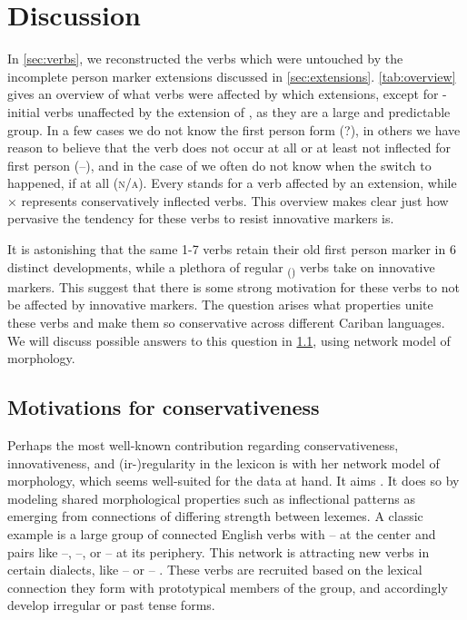\section{Discussion}
\label{sec:discussion}
In \cref{sec:verbs}, we reconstructed the verbs which were untouched by the incomplete person marker extensions discussed in \cref{sec:extensions}.
\cref{tab:overview} gives an overview of what verbs were affected by which extensions, except for -initial \akuriyo verbs unaffected by the extension of , as they are a large and predictable group.
In a few cases we do not know the first person form (?), in others we have reason to believe that the verb does not occur at all or at least not inflected for first person (–), and in the case of  we often do not know when the switch to  happened, if at all (\textsc{n/a}).
Every \checkmark stands for a verb affected by an extension, while × represents conservatively inflected verbs.
This overview makes clear just how pervasive the tendency for these verbs to resist innovative markers is.



It is astonishing that the same 1-7 verbs retain their old first person marker in 6 distinct developments, while a plethora of regular \textsubscript{()} verbs take on innovative markers.
This suggest that there is some strong motivation for these verbs to not be affected by innovative markers.
The question arises what properties unite these verbs and make them so conservative across different Cariban languages.
We will discuss possible answers to this question in \cref{sec:motivations}, using  network model of morphology.

\subsection{Motivations for conservativeness}
\label{sec:motivations}
Perhaps the most well-known contribution regarding conservativeness, innovativeness, and (ir-){}re\-gu\-la\-ri\-ty in the lexicon is \textcite{bybee1985morphology} with her network model of morphology, which seems well-suited for the data at hand.
It aims  \parencite[428]{bybee1995regular}.
It does so by modeling shared morphological properties such as inflectional patterns as emerging from connections of differing strength between lexemes.
A classic example is a large group of connected  English verbs with -- at the center and pairs like --, --, or -- at its periphery.
This network is attracting new verbs in certain dialects, like -- or -- \parencite[129--130]{bybee1985morphology}.
These verbs are recruited based on the lexical connection they form with prototypical members of the group, and accordingly develop irregular or  past tense forms.

